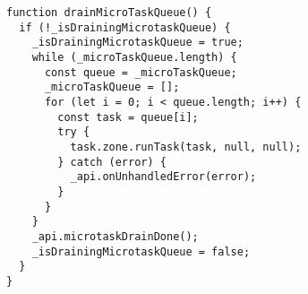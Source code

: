 \begin{verbatim}
function drainMicroTaskQueue() {
  if (!_isDrainingMicrotaskQueue) {
    _isDrainingMicrotaskQueue = true;
    while (_microTaskQueue.length) {
      const queue = _microTaskQueue;
      _microTaskQueue = [];
      for (let i = 0; i < queue.length; i++) {
        const task = queue[i];
        try {
          task.zone.runTask(task, null, null);
        } catch (error) {
          _api.onUnhandledError(error);
        }
      }
    }
    _api.microtaskDrainDone();
    _isDrainingMicrotaskQueue = false;
  }
}
\end{verbatim}
